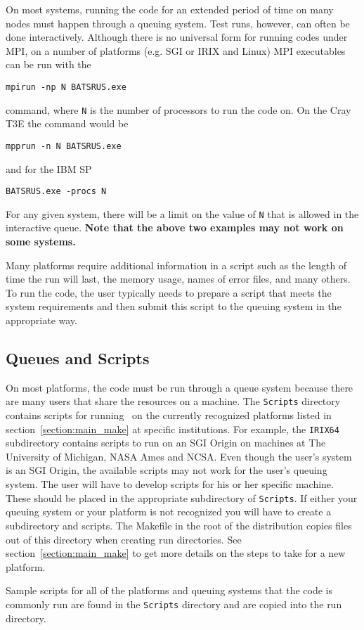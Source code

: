On most systems, running the code for an extended period of time
on many nodes must happen through a queuing system.  Test runs, however,
can often be done interactively.
Although there is no universal form for running codes under MPI, on a 
number of platforms (e.g. SGI or IRIX and Linux) MPI executables
can be run with the 
\begin{verbatim}
mpirun -np N BATSRUS.exe
\end{verbatim}
command, where {\tt N} is the number of processors to run the code on.  
On the Cray T3E the command would be
\begin{verbatim}
mpprun -n N BATSRUS.exe
\end{verbatim}
and for the IBM SP
\begin{verbatim}
BATSRUS.exe -procs N
\end{verbatim}
For any given system, there will be a limit on the value of {\tt N}
that is allowed in the interactive queue.  {\bf Note that the above two
examples may not work on some systems.}


Many
platforms require additional information in a script such as the length of time
the run will last, the memory usage, names of error files, and many others.
To run the code, the user typically needs to prepare a script that meets the
system requirements and then submit this script to the queuing system in the 
appropriate way.


\subsection{Queues and Scripts \label{section:queues}}

On most platforms, the code must be run through a queue system because
there are many users that share the resources on a machine.  
The {\tt Scripts}
directory contains scripts for running  \BATSRUS\ on the currently recognized 
platforms listed in section~\ref{section:main_make} 
at specific institutions.  For example, the {\tt IRIX64} subdirectory
contains scripts to run on an SGI Origin on machines at The University of
Michigan, NASA Ames  and NCSA.  Even though the user's system is an SGI
Origin, the available scripts may not work for the user's queuing system.
The user will have to develop scripts for his or her specific machine. 
These should be placed in the appropriate subdirectory of {\tt Scripts}.
If either your queuing system or your platform is not recognized you will
have to create a subdirectory and scripts.
The Makefile in the root of the distribution copies files out of this
directory when creating run directories.  See section~\ref{section:main_make} 
to get more details on the steps to take for a new platform.


Sample scripts for all of the platforms and queuing systems that the
code is commonly run are found in the {\tt Scripts} directory
and are copied into the run directory.



